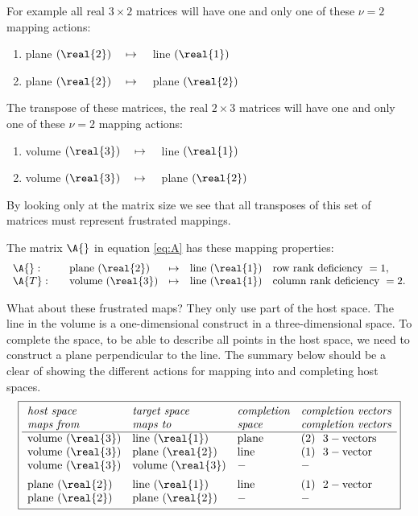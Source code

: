 For example all real $3\times2$ matrices will have one and only one of these $\nu=2$ mapping actions:
\begin{enumerate}
\item plane $(\real{2}) \quad \mapsto \quad$ line   $(\real{1})$
\item plane $(\real{2}) \quad \mapsto \quad$ plane  $(\real{2})$
\end{enumerate}

The transpose of these matrices, the real $2\times3$ matrices will have one and only one of these $\nu=2$ mapping actions:
\begin{enumerate}
\item volume $(\real{3}) \quad \mapsto \quad$ line   $(\real{1})$
\item volume $(\real{3}) \quad \mapsto \quad$ plane  $(\real{2})$
\end{enumerate}
By looking only at the matrix size we see that all transposes of this set of matrices must represent frustrated mappings.

The matrix $\A{}$ in equation \eqref{eq:A} has these mapping properties:
\begin{equation}
  \begin{array}{llcll}
    \A{}:\quad & \text{plane }(\real{2}) &\mapsto & \text{line }(\real{1}) & \text{row rank deficiency }=1,\\
    \A{T}:\quad & \text{volume }(\real{3}) &\mapsto & \text{line }(\real{1}) & \text{column rank deficiency }=2.\\
  \end{array}
\end{equation}

What about these frustrated maps? They only use part of the host space. The line in the volume is a one-dimensional construct in a three-dimensional space. To complete the space, to be able to describe all points in the host space, we need to construct a plane perpendicular to the line. The summary below should be a clear of showing the different actions for mapping into and completing host spaces.
\begin{equation}
\boxed{
\begin{array}{llll}
  \textit{host space  } & \textit{target space} & \textit{completion} & \textit{completion vectors}\\
  \textit{maps from   } & \textit{maps  to} & \textit{space} & \textit{completion vectors}\\\hline
  \text{volume }(\real{3}) & \text{line }  (\real{1}) & \text{plane} & (2)\ \ 3-\text{vectors}\\
  \text{volume }(\real{3}) & \text{plane } (\real{2}) & \text{line}  & (1)\ \ 3-\text{vector}\\
  \text{volume }(\real{3}) & \text{volume }(\real{3}) & - & - \\[5pt]
  \text{plane } (\real{2}) & \text{line }  (\real{1}) & \text{line}  & (1)\ \ 2-\text{vector}\\
  \text{plane } (\real{2}) & \text{plane } (\real{2}) & - & -
\end{array}
}
\end{equation}

